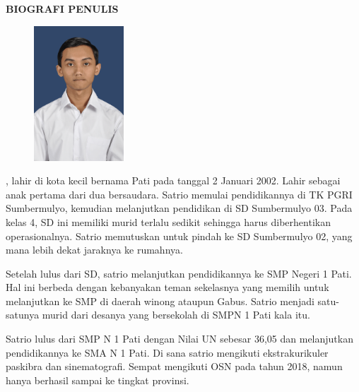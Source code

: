 \begin{center}
  \Large
  \textbf{BIOGRAFI PENULIS}
\end{center}


\vspace{2ex}

\begin{figure}
  \centering
  \vspace{-3ex}
  \includegraphics[width=0.3\textwidth]{gambar/foto diri.png}
  \vspace{-4ex}
\end{figure}

\name{}, lahir di kota kecil bernama Pati pada tanggal 2 Januari 2002. Lahir sebagai anak pertama dari dua bersaudara. Satrio memulai pendidikannya di TK PGRI Sumbermulyo, kemudian melanjutkan pendidikan di SD Sumbermulyo 03. Pada kelas 4, SD ini memiliki murid terlalu sedikit sehingga harus diberhentikan operasionalnya. Satrio memutuskan untuk pindah ke SD Sumbermulyo 02, yang mana lebih dekat jaraknya ke rumahnya. 

Setelah lulus dari SD, satrio melanjutkan pendidikannya ke SMP Negeri 1 Pati. Hal ini berbeda dengan kebanyakan teman sekelasnya yang memilih untuk melanjutkan ke SMP di daerah winong ataupun Gabus. Satrio menjadi satu-satunya murid dari desanya yang bersekolah di SMPN 1 Pati kala itu.

Satrio lulus dari SMP N 1 Pati dengan Nilai UN sebesar 36,05 dan melanjutkan pendidikannya ke SMA N 1 Pati. Di sana satrio mengikuti ekstrakurikuler paskibra dan sinematografi. Sempat mengikuti OSN pada tahun 2018, namun hanya berhasil sampai ke tingkat provinsi.